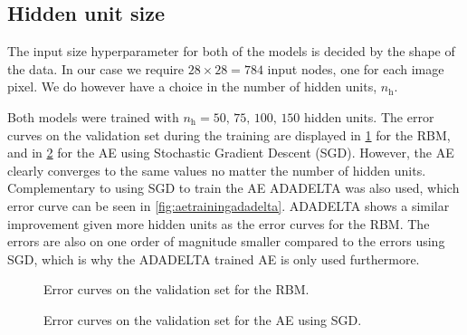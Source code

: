\documentclass{article}
\begin{document}
\subsection{Hidden unit size}
The input size hyperparameter for both of the models is decided by the shape of the data.
In our case we require $28 \times 28 = 784$ input nodes, one for each image pixel.
We do however have a choice in the number of hidden units, $n_{\text{h}}$.

Both models were trained with $n_\text{h} = 50,\,75,\,100,\,150$ hidden units.
The error curves on the validation set during the training are displayed
in \cref{fig:rbmtraining} for the RBM,
and in \cref{fig:aetrainingsgd} for the AE using Stochastic Gradient Descent (SGD).
However, the AE clearly converges to the same values no matter the number of hidden units.
Complementary to using SGD to train the AE ADADELTA \cite{adadelta} was also used,
which error curve can be seen in \cref{fig:aetrainingadadelta}.
ADADELTA shows a similar improvement given more hidden units as the error curves for the RBM.
The errors are also on one order of magnitude smaller compared to the errors using SGD,
which is why the ADADELTA trained AE is only used furthermore.

\begin{figure}[!ht]
  \centering
  \caption{Error curves on the validation set for the RBM.}
  \label{fig:rbmtraining}
\end{figure}


\begin{figure}[!ht]
  \centering
  \caption{Error curves on the validation set for the AE using SGD.}
  \label{fig:aetrainingsgd}
\end{figure}
\end{document}

